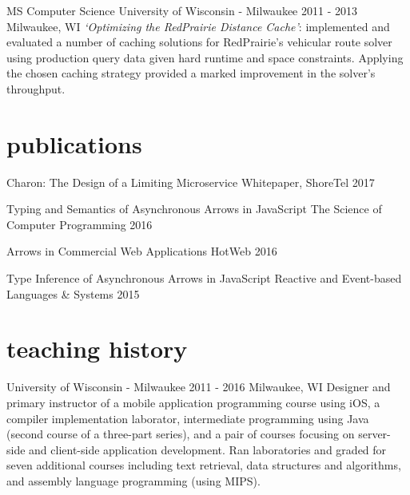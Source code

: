 \documentclass[]{clean-resume}
\begin{document}
\entry
  {MS Computer Science}
  {University of Wisconsin - Milwaukee}
  {2011 - 2013}
  {Milwaukee, WI}
  {
    \emph{`Optimizing the RedPrairie Distance Cache'}: implemented and evaluated a number of caching solutions for RedPrairie's vehicular route solver using production query data given hard runtime and space constraints. Applying the chosen caching strategy provided a marked improvement in the solver's throughput.
  }

\section{publications}

\shortentry
  {Charon: The Design of a Limiting Microservice}
  {Whitepaper, ShoreTel}
  {2017}

\shortentry
  {Typing and Semantics of Asynchronous Arrows in JavaScript}
  {The Science of Computer Programming}
  {2016}
  
\shortentry
  {Arrows in Commercial Web Applications}
  {HotWeb}
  {2016}
  
\shortentry
  {Type Inference of Asynchronous Arrows in JavaScript}
  {Reactive and Event-based Languages \& Systems}
  {2015}

\section{teaching history}

\entry
  {University of Wisconsin - Milwaukee}
  {}
  {2011 - 2016}
  {Milwaukee, WI}
  {
    Designer and primary instructor of a mobile application programming course using iOS, a compiler implementation laborator, intermediate programming using Java (second course of a three-part series), and a pair of courses focusing on server-side and client-side application development. Ran laboratories and graded for seven additional courses including text retrieval, data structures and algorithms, and assembly language programming (using MIPS).
  }
\end{document}
